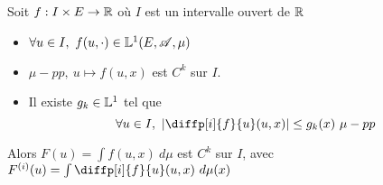 \begin{theorem}
	Soit $f: I \times E \to \mathbb{R}$ où $I$ est un intervalle ouvert de $\mathbb{R}$\\

	\begin{itemize}
		\item $\forall u \in I, \ f(u,\cdot) \in \mathbb{L}^1(E,\mathscr{A},\mu)$
		\item $\mu-pp, \ u \mapsto f(u,x)$ est $C^k$ sur $I$.
		\item Il existe $g_k\in \mathbb{L}^1$ tel que
		      $$ \forall u\in I,\ \left|\diffp[i]{f}{u}(u,x)\right| \leq g_k(x) \ \mu-pp$$
	\end{itemize}

	Alors $F(u) = \int f(u,x)\ d\mu$ est $C^k$ sur $I$, avec $F^{(i)}(u) = \int \diffp[i]{f}{u}(u,x) \ d\mu(x)$

\end{theorem}

